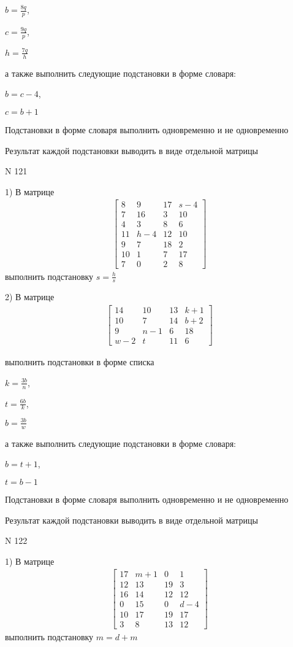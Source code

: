 \documentclass[11pt]{report}
\begin{document}
$b=\frac{8 q}{p}$,

$c=\frac{9 q}{p}$,

$h=\frac{7 q}{h}$

а также выполнить следующие подстановки в форме словаря:

$b=c - 4$,

$c=b + 1$


    Подстановки в форме словаря выполнить одновременно и не одновременно


    Результат каждой подстановки выводить в виде отдельной матрицы

\newpage
N 121


    1) В матрице
\begin{align*}
\left[\begin{matrix}8 & 9 & 17 & s - 4\\7 & 16 & 3 & 10\\4 & 3 & 8 & 6\\11 & h - 4 & 12 & 10\\9 & 7 & 18 & 2\\10 & 1 & 7 & 17\\7 & 0 & 2 & 8\end{matrix}\right]
\end{align*}
выполнить подстановку $s=\frac{h}{s}$


    2) В матрице
\begin{align*}
\left[\begin{matrix}14 & 10 & 13 & k + 1\\10 & 7 & 14 & b + 2\\9 & n - 1 & 6 & 18\\w - 2 & t & 11 & 6\end{matrix}\right]
\end{align*}

выполнить подстановки в форме списка

$k=\frac{3 b}{n}$,

$t=\frac{6 b}{k}$,

$b=\frac{3 b}{w}$

а также выполнить следующие подстановки в форме словаря:

$b=t + 1$,

$t=b - 1$


    Подстановки в форме словаря выполнить одновременно и не одновременно


    Результат каждой подстановки выводить в виде отдельной матрицы

\newpage
N 122


    1) В матрице
\begin{align*}
\left[\begin{matrix}17 & m + 1 & 0 & 1\\12 & 13 & 19 & 3\\16 & 14 & 12 & 12\\0 & 15 & 0 & d - 4\\10 & 17 & 19 & 17\\3 & 8 & 13 & 12\end{matrix}\right]
\end{align*}
выполнить подстановку $m=d + m$
\end{document}
